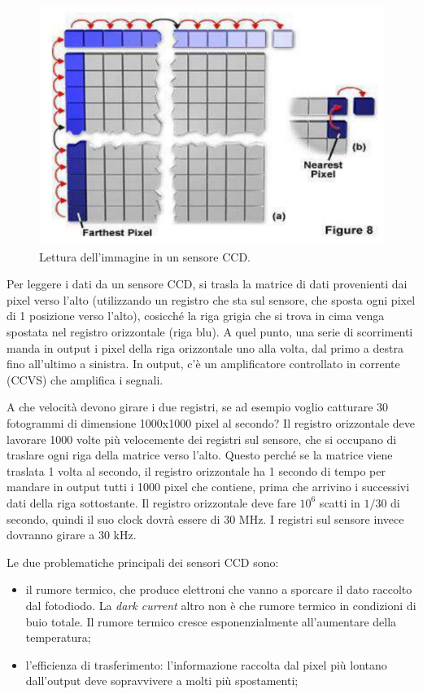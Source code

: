 \documentclass[a4paper,11pt]{article}
\begin{document}
\renewcommand{\thefigure}{3.12}
\begin{figure}[!h]
  \centering
    \includegraphics[scale=0.5]{images/3/outputting.png}
    \caption{Lettura dell'immagine in un sensore CCD.}
\end{figure}

Per leggere i dati da un sensore CCD, si trasla la matrice di dati provenienti dai pixel verso l'alto (utilizzando un registro che sta sul sensore, che sposta ogni pixel di 1 posizione verso l'alto),
cosicché la riga grigia che si trova in cima venga spostata nel registro orizzontale (riga blu). A quel punto, una serie di scorrimenti manda in
output i pixel della riga orizzontale uno alla volta, dal primo a destra fino all'ultimo a sinistra. In output, c'è un amplificatore controllato in corrente (CCVS) che amplifica i segnali.
\par
A che velocità devono girare i due registri, se ad esempio voglio catturare 30 fotogrammi di dimensione 1000x1000 pixel al secondo?
Il registro orizzontale deve lavorare 1000 volte più velocemente dei registri sul sensore, che si occupano di traslare ogni riga della matrice
verso l'alto. Questo perché se la matrice viene traslata 1 volta al secondo, il registro orizzontale ha 1 secondo di tempo per mandare
in output tutti i 1000 pixel che contiene, prima che arrivino i successivi dati della riga sottostante.
Il registro orizzontale deve fare $10^6$ scatti in $1/30$ di secondo, quindi il suo clock dovrà essere di 30 MHz. I registri sul sensore invece dovranno girare a 30 kHz.
\par
Le due problematiche principali dei sensori CCD sono:
\begin{itemize}
    \item il rumore termico, che produce elettroni che vanno a sporcare il dato raccolto dal fotodiodo. La
    \textit{dark current} altro non è che rumore termico in condizioni di buio totale.
    Il rumore termico cresce esponenzialmente all'aumentare della temperatura;
    \item l'efficienza di trasferimento: l'informazione raccolta dal pixel più lontano dall'output deve sopravvivere a molti più spostamenti;
\end{itemize}
\end{document}
